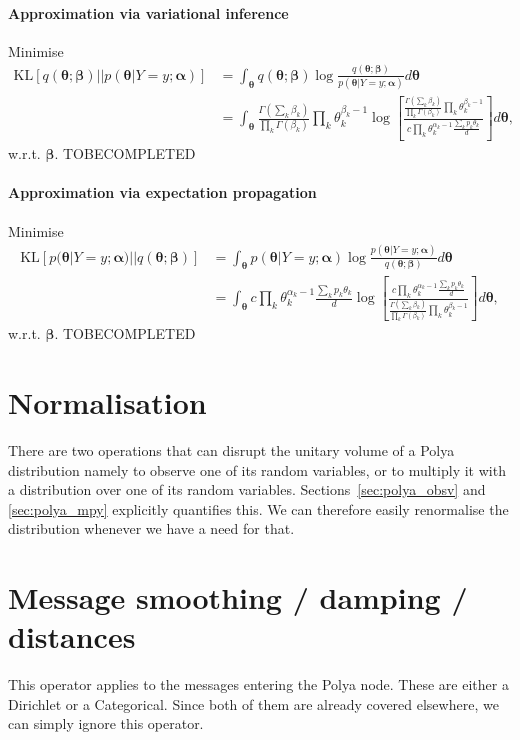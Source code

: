 \documentclass[oneside,english]{scrbook}
\begin{document}
\paragraph{Approximation via variational inference}
Minimise
\begin{align*}
  \text{KL}[q(\bm{\theta};\bm{\beta})||p(\bm{\theta}|Y=y;\bm{\alpha})]
  &= \int_{\bm{\theta}} q(\bm{\theta};\bm{\beta})
  \log{\frac{q(\bm{\theta};\bm{\beta})}{p(\bm{\theta}|Y=y;\bm{\alpha})} d\bm{\theta}} \\
  &= \int_{\bm{\theta}}
  \frac{\Gamma(\sum_k\beta_k)}{\prod_k\Gamma(\beta_k)}\prod_{k}\theta_k^{\beta_k-1}
  \log \left[
    \frac{\frac{\Gamma(\sum_k\beta_k)}{\prod_k\Gamma(\beta_k)}\prod_{k}\theta_k^{\beta_k-1}}
         {c\prod_k\theta_k^{\alpha_k-1}\frac{\sum_kp_k\theta_k}{d}}
         \right] d\bm{\theta},
\end{align*}
w.r.t. $\bm{\beta}$. TOBECOMPLETED

\paragraph{Approximation via expectation propagation}
Minimise
\begin{align*}
  \text{KL}[p(\bm{\theta}|Y=y;\bm{\alpha})||q(\bm{\theta};\bm{\beta})]
  &= \int_{\bm{\theta}} p(\bm{\theta}|Y=y;\bm{\alpha})
  \log{\frac{p(\bm{\theta}|Y=y;\bm{\alpha})}{q(\bm{\theta};\bm{\beta})} d\bm{\theta}} \\
  &= \int_{\bm{\theta}}
  c\prod_k\theta_k^{\alpha_k-1}\frac{\sum_kp_k\theta_k}{d}
  \log \left[
    \frac{c\prod_k\theta_k^{\alpha_k-1}\frac{\sum_kp_k\theta_k}{d}}
         {\frac{\Gamma(\sum_k\beta_k)}{\prod_k\Gamma(\beta_k)}\prod_{k}\theta_k^{\beta_k-1}}
         \right] d\bm{\theta},
\end{align*}
w.r.t. $\bm{\beta}$. TOBECOMPLETED

\section{Normalisation}
There are two operations that can disrupt the unitary volume of a
Polya distribution namely to observe one of its random variables, or
to multiply it with a distribution over one of its random variables.
Sections~\ref{sec:polya_obsv} and \ref{sec:polya_mpy} explicitly
quantifies this. We can therefore easily renormalise the distribution
whenever we have a need for that.

\section{Message smoothing / damping / distances}
This operator applies to the messages entering the Polya node. These
are either a Dirichlet or a Categorical. Since both of them are
already covered elsewhere, we can simply ignore this operator.
\end{document}
